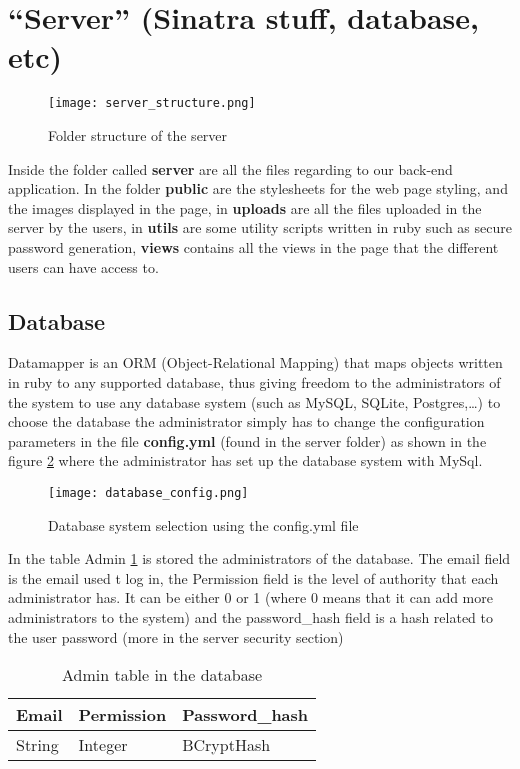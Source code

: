 \section{``Server'' (Sinatra stuff, database, etc)}

\begin{figure}[htb]
\centering
\texttt{[image: server\_structure.png]}
\caption{Folder structure of the server}
\label{fig:server_structure}
\end{figure}

  Inside the folder called {\bf server} are all the files regarding to our back-end application. In the folder {\bf public} are the stylesheets for the web page styling, and the images 
displayed in the page, in {\bf uploads} are all the files uploaded in the server by the users, in {\bf utils} are some utility scripts written in ruby such as secure password generation,
{\bf views} contains all the views in the page that the different users can have access to.

\subsection{Database}

  Datamapper is an ORM (Object-Relational Mapping) that maps objects written in ruby to any supported database, thus giving freedom to the administrators of the system to use any database system (such as 
MySQL, SQLite, Postgres,\ldots) to choose the database the administrator simply has to change the configuration parameters in the file {\bf config.yml} (found in the server folder) as shown in the 
figure \ref{fig:database_config} where the administrator has set up the database system with MySql.

\begin{figure}[htb]
\centering
\texttt{[image: database\_config.png]}
\caption{Database system selection using the config.yml file}
\label{fig:database_config}
\end{figure}

In the table Admin \ref{tab:admin_table} is stored the administrators of the database. The email field is the email used t log in,
the Permission field is the level of authority that each administrator has. It can be either 0 or 1 (where 0 means that it can add
more administrators to the system) and the password\_hash field is a hash related to the user password (more in the server security section)
\begin{table}
\centering
    \begin{tabular}{ | l | l | l |}
    \hline
    Email & Permission & Password\_hash  \\ \hline
    String & Integer & BCryptHash \\ \hline
    \end{tabular}
    \caption{Admin table in the database}
    \label{tab:admin_table}
\end{table}

